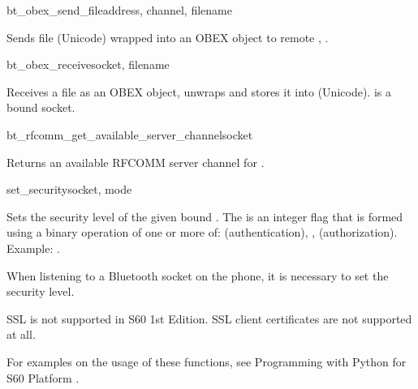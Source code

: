 \begin{funcdesc}{bt_obex_send_file}{address, channel, filename}

Sends file  (Unicode) wrapped into an OBEX object 
to remote , .

\end{funcdesc}

\begin{funcdesc}{bt_obex_receive}{socket, filename}

Receives a file as an OBEX object, unwraps and stores it into  
(Unicode).  is a bound  socket.

\end{funcdesc}

\begin{funcdesc}{bt_rfcomm_get_available_server_channel}{socket}

Returns an available RFCOMM server channel for .

\end{funcdesc}

\begin{funcdesc}{set_security}{socket, mode}

Sets the security level of the given bound . The 
 is an integer flag that is formed using a binary 
 operation of one or more of:  (authentication), 
,  (authorization). Example: 
.

\end{funcdesc}

\begin{notice}[note]
When listening to a Bluetooth socket on the phone, it is necessary to set 
the security level.
\end{notice}

\begin{notice}[note]
SSL is not supported in S60 1st Edition. SSL client certificates are 
not supported at all.
\end{notice}

For examples on the usage of these functions, see Programming with Python for 
S60 Platform \cite{PyS60Prog}.
